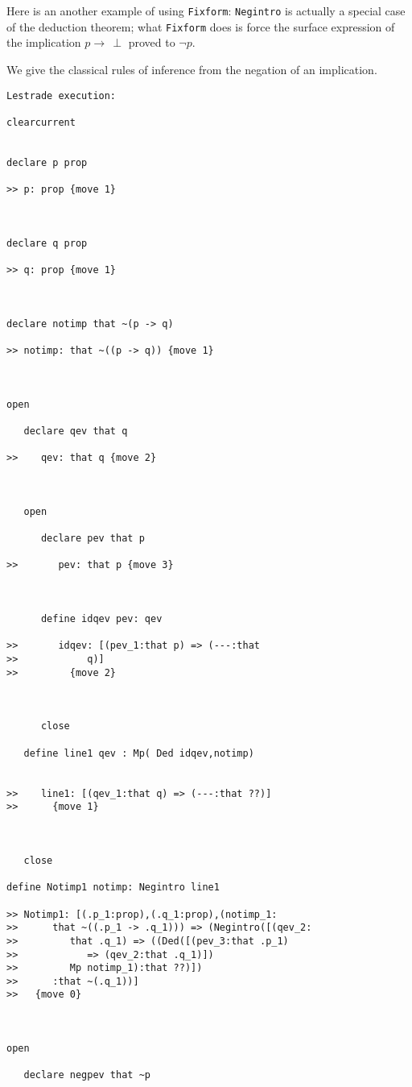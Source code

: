 \documentclass[12pt]{article}
\begin{document}
Here is an another example of using {\tt Fixform}:  {\tt Negintro} is actually a special case of the deduction theorem;  what {\tt Fixform} does is force the surface expression of the implication
$p \rightarrow \, \perp$ proved to $\neg p$.

We give the classical rules of inference from the negation of an implication.

\begin{verbatim}Lestrade execution:

clearcurrent


declare p prop

>> p: prop {move 1}



declare q prop

>> q: prop {move 1}



declare notimp that ~(p -> q)

>> notimp: that ~((p -> q)) {move 1}



open

   declare qev that q

>>    qev: that q {move 2}



   open

      declare pev that p

>>       pev: that p {move 3}



      define idqev pev: qev

>>       idqev: [(pev_1:that p) => (---:that
>>            q)]
>>         {move 2}



      close

   define line1 qev : Mp( Ded idqev,notimp)


>>    line1: [(qev_1:that q) => (---:that ??)]
>>      {move 1}



   close

define Notimp1 notimp: Negintro line1

>> Notimp1: [(.p_1:prop),(.q_1:prop),(notimp_1:
>>      that ~((.p_1 -> .q_1))) => (Negintro([(qev_2:
>>         that .q_1) => ((Ded([(pev_3:that .p_1)
>>            => (qev_2:that .q_1)])
>>         Mp notimp_1):that ??)])
>>      :that ~(.q_1))]
>>   {move 0}



open

   declare negpev that ~p


\end{verbatim}
\end{document}
